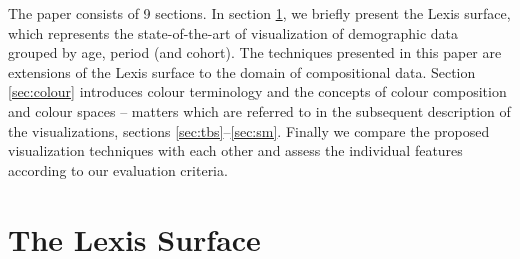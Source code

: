 \documentclass{scrartcl}
\begin{document}
The paper consists of 9 sections. In section \ref{sec:lexis}, we briefly present the Lexis surface, which represents the state-of-the-art of visualization of demographic data grouped by age, period (and cohort). The techniques presented in this paper are extensions of the Lexis surface to the domain of compositional data. Section \ref{sec:colour} introduces colour terminology and the concepts of colour composition and colour spaces -- matters which are referred to in the subsequent description of the visualizations, sections \ref{sec:tbs}--\ref{sec:sm}. Finally we compare the proposed visualization techniques with each other and assess the individual features according to our evaluation criteria.

\clearpage

\section{The Lexis Surface} %
\label{sec:lexis}
\end{document}
